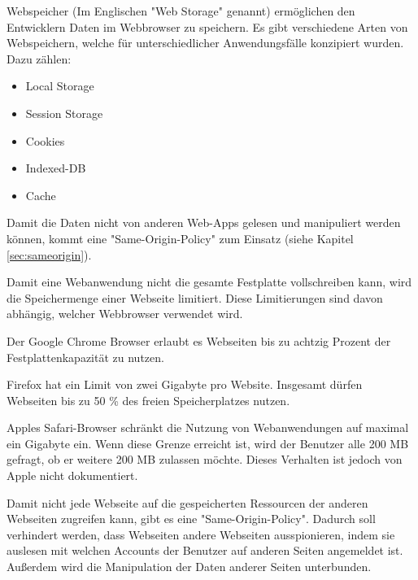 \label{sec:webstorage}


Webspeicher (Im Englischen "Web Storage" genannt) ermöglichen den Entwicklern %
Daten im Webbrowser zu speichern.
Es gibt verschiedene Arten von Webspeichern, welche für unterschiedlicher Anwendungsfälle konzipiert wurden. Dazu zählen:

\begin{itemize}
    \item Local Storage
    \item Session Storage
    \item Cookies
    \item Indexed-DB
    \item Cache
\end{itemize}

Damit die Daten nicht von anderen Web-Apps gelesen und manipuliert werden können, kommt eine  "Same-Origin-Policy" zum Einsatz (siehe Kapitel \ref{sec:sameorigin}).


Damit eine Webanwendung nicht die gesamte Festplatte vollschreiben kann, wird die Speichermenge einer Webseite limitiert. Diese Limitierungen sind davon abhängig, welcher Webbrowser verwendet wird.

Der Google Chrome Browser erlaubt es Webseiten bis zu achtzig Prozent der Festplattenkapazität zu nutzen.

Firefox hat ein Limit von zwei Gigabyte pro Website. Insgesamt dürfen Webseiten bis zu 50 \% des freien Speicherplatzes nutzen.

Apples Safari-Browser schränkt die Nutzung von Webanwendungen auf maximal ein Gigabyte ein. Wenn diese Grenze erreicht ist, wird der Benutzer alle 200 MB gefragt, ob er weitere 200 MB zulassen möchte. Dieses Verhalten ist jedoch von Apple nicht dokumentiert. \cite{WebDevStorage}

 \label{sec:sameorigin}

Damit nicht jede Webseite auf die gespeicherten Ressourcen der anderen Webseiten zugreifen kann, gibt es eine "Same-Origin-Policy".
Dadurch soll verhindert werden, dass Webseiten andere Webseiten ausspionieren, indem sie auslesen mit welchen Accounts der Benutzer auf anderen Seiten angemeldet ist. Außerdem wird die Manipulation der Daten anderer Seiten unterbunden.

